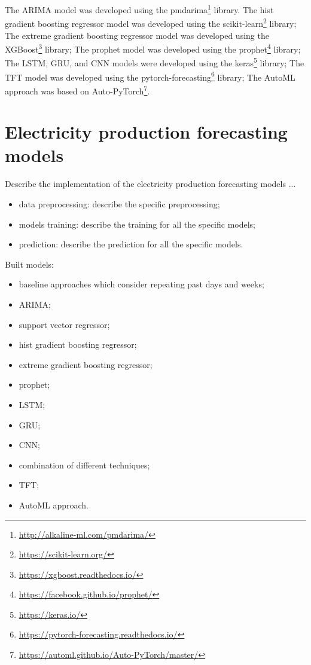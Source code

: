 The ARIMA model was developed using the pmdarima\footnote{ \url{http://alkaline-ml.com/pmdarima/} } library.
The hist gradient boosting regressor model was developed using the scikit-learn\footnote{ \url{https://scikit-learn.org/} } library;
The extreme gradient boosting regressor model was developed using the XGBoost\footnote{ \url{https://xgboost.readthedocs.io/} } library;
The prophet model was developed using the prophet\footnote{ \url{https://facebook.github.io/prophet/} } library;
The LSTM, GRU, and CNN models were developed using the keras\footnote{ \url{https://keras.io/} } library;
The TFT model was developed using the pytorch-forecasting\footnote{ \url{https://pytorch-forecasting.readthedocs.io/} } library;
The AutoML approach was based on Auto-PyTorch\footnote{ \url{https://automl.github.io/Auto-PyTorch/master/} }.


\section{Electricity production forecasting models}
\label{sec:productionimpl}
\vspace{0.2 cm}

Describe the implementation of the electricity production forecasting models ...
\begin{itemize}
  \item data preprocessing: describe the specific preprocessing;
  \item models training: describe the training for all the specific models;
  \item prediction: describe the prediction for all the specific models.
\end{itemize}

Built models:
\begin{itemize}
  \item baseline approaches which consider repeating past days and weeks;
  \item ARIMA;
  \item support vector regressor;
  \item hist gradient boosting regressor;
  \item extreme gradient boosting regressor;
  \item prophet;
  \item LSTM;
  \item GRU;
  \item CNN;
  \item combination of different techniques;
  \item TFT;
  \item AutoML approach.
\end{itemize}

